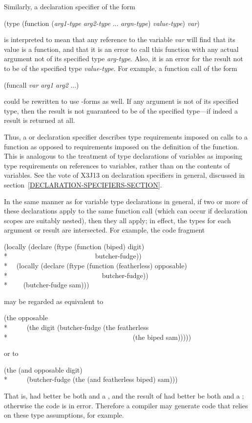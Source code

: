 \begin{flushdesc}
\begin{new}
Similarly, a declaration specifier of the form
\begin{lisp}
(type (function ({\it arg1-type} {\it arg2-type} ... {\it argn-type}) {\it value-type}) {\it var})
\end{lisp}
is interpreted to mean that any reference to the variable {\it var}
will find that its value is a function, and that
it is an error to call this function with any actual argument not of
its specified type {\it arg-type}.
Also, it is an error for the result not to be of the specified
type {\it value-type}.
For example, a function call of the form
\begin{lisp}
(funcall {\it var} {\it arg1} {\it arg2} ...)
\end{lisp}
could be rewritten to use -forms as well.
If any argument is not of
its specified type, then the result is not guaranteed to be of the
specified type---if indeed a result is returned at all.


Thus, a  or  declaration specifier describes type
requirements imposed on calls to a function
as opposed to requirements imposed on the definition of the function.
This is analogous to the treatment of type declarations of variables
as imposing type requirements on references to variables, rather than
on the contents of variables.  See the vote of X3J13 on 
declaration specifiers in general, discussed
in section~\ref{DECLARATION-SPECIFIERS-SECTION}.

In the same manner as for variable type declarations in general,
if two or more
of these declarations apply to the same function call (which can
occur if declaration scopes are suitably nested), then they all apply;
in effect, the types for each argument or result are intersected.
For example, the code fragment
\begin{lisp}
(locally (declare (ftype (function (biped) digit) \\*
~~~~~~~~~~~~~~~~~~~~~~~~~butcher-fudge)) \\*
~~(locally (declare (ftype (function (featherless) opposable) \\*
~~~~~~~~~~~~~~~~~~~~~~~~~~~butcher-fudge)) \\*
~~~~(butcher-fudge sam)))
\end{lisp}
may be regarded as equivalent to
\begin{lisp}
(the opposable \\*
~~~~~(the digit (butcher-fudge (the featherless \\*
~~~~~~~~~~~~~~~~~~~~~~~~~~~~~~~~~~~~(the biped sam)))))
\end{lisp}
or to
\begin{lisp}
(the (and opposable digit) \\*
~~~~~(butcher-fudge (the (and featherless biped) sam)))
\end{lisp}
That is,  had better be both  and a ,
and the result of  had better be both
 and a ; otherwise the code is in error.
Therefore a compiler may generate code that relies on these type assumptions,
for example.
\end{new}



\end{flushdesc}
